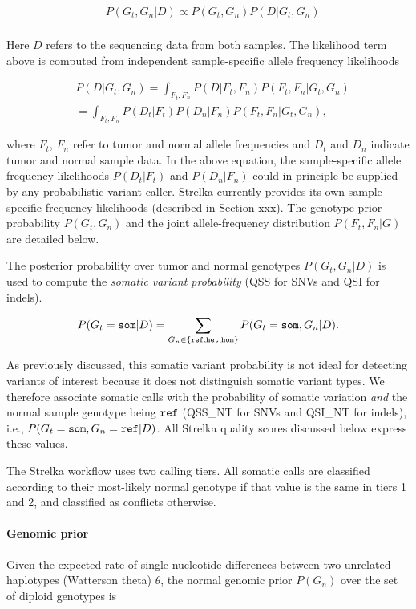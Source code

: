 \documentclass{article}
\begin{document}
\begin{align*}
	& P(G_t,G_n|D) \propto P(G_t,G_n) P(D|G_t,G_n) \\
\end{align*}


Here $D$ refers to the sequencing data from both samples. The likelihood term above is computed from independent sample-specific allele frequency likelihoods 

\begin{align*}
	& P(D|G_t,G_n) = \int_{F_t,F_n}{P(D|F_t,F_n)P(F_t,F_n|G_t,G_n)} \\
	& = \int_{F_t,F_n}{P(D_t|F_t)P(D_n|F_n)P(F_t,F_n|G_t,G_n)},
\end{align*}

\noindent where $F_t$, $F_n$ refer to tumor and normal allele frequencies and $D_t$ and $D_n$ indicate tumor and normal sample data. In the above equation, the sample-specific allele frequency likelihoods $P(D_t|F_t)$ and $P(D_n|F_n)$ could in principle be supplied by any probabilistic variant caller. Strelka currently provides its own sample-specific frequency likelihoods (described in Section xxx). The genotype prior probability $P(G_t, G_n)$ and the joint allele-frequency distribution $P(F_t,F_n|G)$ are detailed below. 

The posterior probability over tumor and normal genotypes $P(G_t,G_n|D)$ is used to compute the {\em somatic variant probability} (QSS for SNVs and QSI for indels).

\begin{equation*}
	P(G_t = {\tt som} | D) = \sum_{G_n \in \{ {\tt ref}, {\tt het}, \tt{hom} \}}{P(G_t={\tt som},G_n|D)}.
\end{equation*}

As previously discussed, this somatic variant probability is not ideal for detecting variants of interest because it does not distinguish somatic variant types. We therefore associate somatic calls with the probability of somatic variation {\em and} the normal sample genotype being $\tt ref$ (QSS\_NT for SNVs and QSI\_NT for indels), i.e., $P(G_t = {\tt som}, G_n = {\tt ref} | D)$. All Strelka quality scores discussed below express these values.

The Strelka workflow uses two calling tiers. All somatic calls are classified according to their most-likely normal genotype if that value is the same in tiers 1 and 2, and classified as conflicts otherwise. 

\paragraph{Genomic prior}
Given the expected rate of single nucleotide differences between two unrelated haplotypes (Watterson theta) $\theta$, the normal genomic prior $P(G_n)$ over the set of diploid genotypes is
\end{document}

